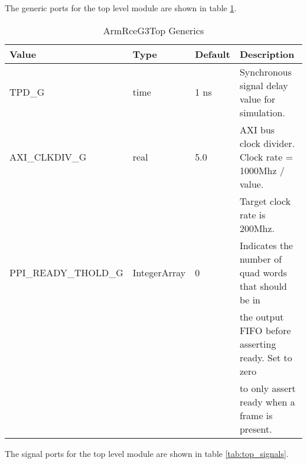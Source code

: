 \documentclass[11pt]{article}
\begin{document}
The generic ports for the top level module are shown in table \ref{tab:top_generics}.

\begin{table}[H]
\small
\centering
   \begin{tabular}{| l | l | l | l | }
      \hline \textbf{Value} & \textbf{Type} & \textbf{Default} & \textbf{Description} \\
      \hline TPD\_G          & time    & 1 ns  & Synchronous signal delay value for simulation.       \\
      \hline AXI\_CLKDIV\_G  & real    & 5.0   & AXI bus clock divider. Clock rate = 1000Mhz / value. \\
                             &         &       & Target clock rate is 200Mhz.                         \\
      \hline PPI\_READY\_THOLD\_G & IntegerArray & 0 & Indicates the number of quad words that should be in \\
                             &         &       & the output FIFO before asserting ready. Set to zero \\
                             &         &       & to only assert ready when a frame is present. \\
      \hline
   \end{tabular}
   \caption{ArmRceG3Top Generics}
   \label{tab:top_generics}
\end{table}

The signal ports for the top level module are shown in table \ref{tab:top_signals}. 
\end{document}
